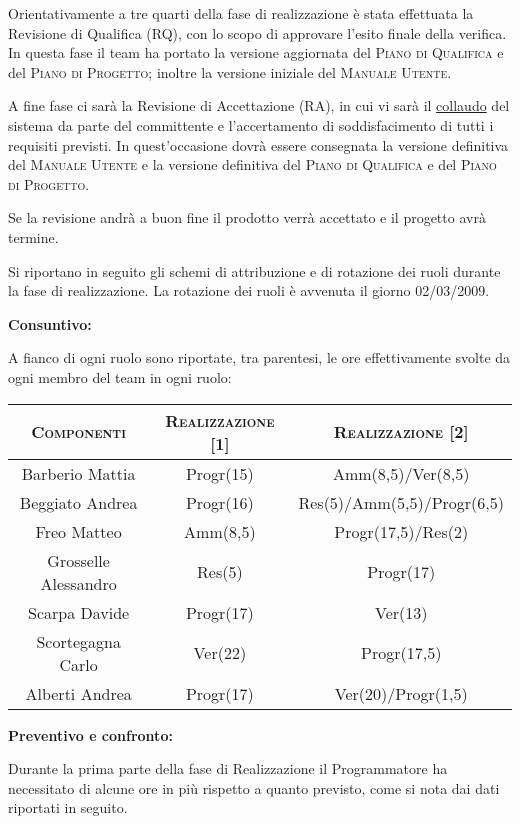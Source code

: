 \documentclass[11pt,a4paper]{article}
\begin{document}
Orientativamente a tre quarti della fase di realizzazione è stata effettuata la Revisione di Qualifica (RQ), con lo scopo di approvare l'esito finale della verifica. In questa fase il team ha portato la versione aggiornata del \textsc{Piano di Qualifica} e del \textsc{Piano di Progetto}; inoltre la versione iniziale del \textsc{Manuale Utente}.

A fine fase ci sarà la Revisione di Accettazione (RA), in cui vi sarà il \underline{collaudo} del sistema da parte del committente e l'accertamento di soddisfacimento di tutti i requisiti previsti. In quest'occasione dovrà essere consegnata la versione definitiva del \textsc{Manuale Utente} e la versione definitiva del \textsc{Piano di Qualifica} e del \textsc{Piano di Progetto}.

Se la revisione andrà a buon fine il prodotto verrà accettato e il progetto avrà termine.

Si riportano in seguito gli schemi di attribuzione e di rotazione dei ruoli durante la fase di realizzazione. La rotazione dei ruoli è avvenuta il giorno 02/03/2009.

\bigskip \bigskip
\begin{large}\textbf{Consuntivo:}\end{large}
\newline
A fianco di ogni ruolo sono riportate, tra parentesi, le ore effettivamente svolte da ogni membro del team in ogni ruolo:
\\
\begin{center}
\begin{tabular}{|c||c|c|}
\hline
\textsc{Componenti} & \textsc{Realizzazione [1]} & \textsc{Realizzazione [2]} \\ \hline \hline
Barberio Mattia & Progr(15) & Amm(8,5)/Ver(8,5) \\ \hline
Beggiato Andrea & Progr(16) & Res(5)/Amm(5,5)/Progr(6,5) \\ \hline
Freo Matteo & Amm(8,5) & Progr(17,5)/Res(2) \\ \hline
Grosselle Alessandro & Res(5) & Progr(17) \\ \hline
Scarpa Davide & Progr(17) & Ver(13) \\ \hline
Scortegagna Carlo & Ver(22) & Progr(17,5) \\ \hline
Alberti Andrea & Progr(17) & Ver(20)/Progr(1,5) \\ \hline
\end{tabular}
\end{center}

\bigskip \bigskip
\begin{large}\textbf{Preventivo e confronto:}\end{large}
\newline
Durante la prima parte della fase di Realizzazione il Programmatore ha necessitato di alcune ore in più rispetto a quanto previsto, come si nota dai dati riportati in seguito.
\end{document}
